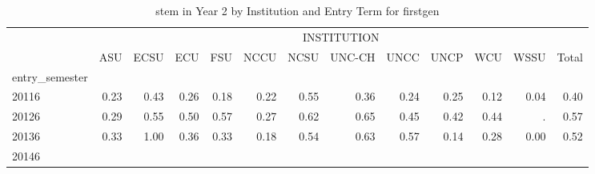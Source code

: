 \begin{table}[!h]
\caption{stem in Year 2 by Institution and Entry Term for firstgen}
\centering
\begin{tabular}{lllllllllllll}
\cline{1-13}
\multicolumn{1}{c}{} &
  \multicolumn{12}{|c}{INSTITUTION} \\
\multicolumn{1}{c}{} &
  \multicolumn{1}{|r}{ASU} &
  \multicolumn{1}{r}{ECSU} &
  \multicolumn{1}{r}{ECU} &
  \multicolumn{1}{r}{FSU} &
  \multicolumn{1}{r}{NCCU} &
  \multicolumn{1}{r}{NCSU} &
  \multicolumn{1}{r}{UNC-CH} &
  \multicolumn{1}{r}{UNCC} &
  \multicolumn{1}{r}{UNCP} &
  \multicolumn{1}{r}{WCU} &
  \multicolumn{1}{r}{WSSU} &
  \multicolumn{1}{r}{Total} \\
\cline{1-13}
\multicolumn{1}{l}{entry\_semester} &
  \multicolumn{1}{|r}{} &
  \multicolumn{1}{r}{} &
  \multicolumn{1}{r}{} &
  \multicolumn{1}{r}{} &
  \multicolumn{1}{r}{} &
  \multicolumn{1}{r}{} &
  \multicolumn{1}{r}{} &
  \multicolumn{1}{r}{} &
  \multicolumn{1}{r}{} &
  \multicolumn{1}{r}{} &
  \multicolumn{1}{r}{} &
  \multicolumn{1}{r}{} \\
\multicolumn{1}{l}{\hspace{1em}20116} &
  \multicolumn{1}{|r}{0.23} &
  \multicolumn{1}{r}{0.43} &
  \multicolumn{1}{r}{0.26} &
  \multicolumn{1}{r}{0.18} &
  \multicolumn{1}{r}{0.22} &
  \multicolumn{1}{r}{0.55} &
  \multicolumn{1}{r}{0.36} &
  \multicolumn{1}{r}{0.24} &
  \multicolumn{1}{r}{0.25} &
  \multicolumn{1}{r}{0.12} &
  \multicolumn{1}{r}{0.04} &
  \multicolumn{1}{r}{0.40} \\
\multicolumn{1}{l}{\hspace{1em}20126} &
  \multicolumn{1}{|r}{0.29} &
  \multicolumn{1}{r}{0.55} &
  \multicolumn{1}{r}{0.50} &
  \multicolumn{1}{r}{0.57} &
  \multicolumn{1}{r}{0.27} &
  \multicolumn{1}{r}{0.62} &
  \multicolumn{1}{r}{0.65} &
  \multicolumn{1}{r}{0.45} &
  \multicolumn{1}{r}{0.42} &
  \multicolumn{1}{r}{0.44} &
  \multicolumn{1}{r}{.} &
  \multicolumn{1}{r}{0.57} \\
\multicolumn{1}{l}{\hspace{1em}20136} &
  \multicolumn{1}{|r}{0.33} &
  \multicolumn{1}{r}{1.00} &
  \multicolumn{1}{r}{0.36} &
  \multicolumn{1}{r}{0.33} &
  \multicolumn{1}{r}{0.18} &
  \multicolumn{1}{r}{0.54} &
  \multicolumn{1}{r}{0.63} &
  \multicolumn{1}{r}{0.57} &
  \multicolumn{1}{r}{0.14} &
  \multicolumn{1}{r}{0.28} &
  \multicolumn{1}{r}{0.00} &
  \multicolumn{1}{r}{0.52} \\
\multicolumn{1}{l}{\hspace{1em}20146} &

\end{tabular}
\end{table}
